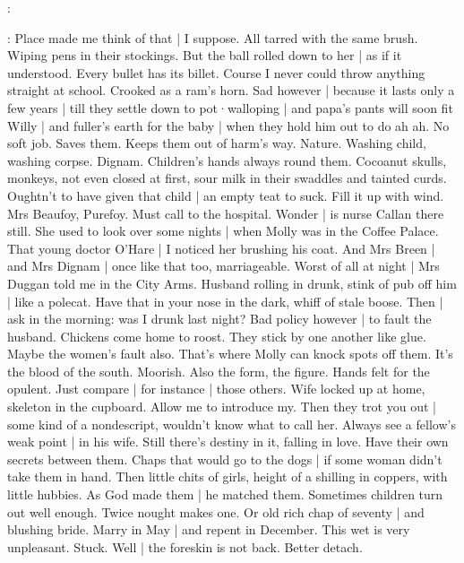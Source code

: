 :

\Bloom:
Place made me think of that |
I suppose.
All tarred with the same brush.
Wiping pens in their stockings.%
But the ball rolled down to her |
as if it understood.
Every bullet has its billet.
Course
I never could throw anything straight at school.
Crooked as a ram's horn.
Sad however |
because it lasts only a few years |
till they settle down to pot·walloping |
and papa's pants will soon fit Willy |
and fuller's earth for the baby |
when they hold him out to do ah ah.
No soft job.
Saves them.
Keeps them out of harm's way.
Nature.
Washing child,
washing corpse.
Dignam.
Children's hands always round them.
Cocoanut skulls,
monkeys,
not even closed at first,
sour milk in their swaddles and tainted curds.
Oughtn't to have given that child |
an empty teat to suck.
Fill it up with wind.
Mrs Beaufoy,
Purefoy.
Must call to the hospital.
Wonder |
is nurse Callan there still.%
She used to look over some nights |
when Molly was in the Coffee Palace.
That young doctor O'Hare |
I noticed her brushing his coat.
And Mrs Breen |
and Mrs Dignam |
once like that too,
marriageable.
Worst of all at night |
Mrs Duggan told me in the City Arms.
Husband rolling in drunk,
stink of pub off him |
like a polecat.
Have that in your nose in the dark,
whiff of stale boose.
Then |
ask in the morning:
was I drunk last night?
Bad policy however |
to fault the husband.
Chickens come home to roost.
They stick by one another like glue.
Maybe the women's fault also.
That's where Molly can knock spots off them.
It's the blood of the south.
Moorish.
Also the form,
the figure.
Hands felt for the opulent.
Just compare |
for instance |
those others.%
Wife locked up at home,
skeleton in the cupboard.
Allow me to introduce my.
Then they trot you out |
some kind of a nondescript,
wouldn't know what to call her.
Always see a fellow's weak point |
in his wife.
Still there's destiny in it,
falling in love.
Have their own secrets between them.
Chaps that would go to the dogs |
if some woman didn't take them in hand.
Then little chits of girls,
height of a shilling in coppers,
with little hubbies.
As God made them |
he matched them.
Sometimes children turn out well enough.
Twice nought makes one.
Or old rich chap of seventy |
and blushing bride.
Marry in May |
and repent in December.
This wet is very unpleasant.
Stuck.
Well |
the foreskin is not back.
Better detach.%

